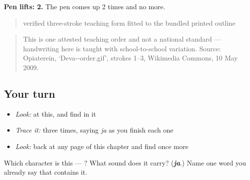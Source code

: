 \textbf{Pen lifts: 2.} The pen comes up 2 times and no more.

\begin{quote}
verified three-stroke teaching form fitted to the bundled printed outline
\end{quote}

\begin{quote}
This is one attested teaching order and not a national standard — handwriting here is taught with school-to-school variation. Source: Opiaterein, ‘Deva--order.gif’, strokes 1–3, Wikimedia Commons, 10 May 2009.
\end{quote}

\subsection*{Your turn}
\begin{itemize}
\raggedright
  \item \emph{Look:} at this, and find  in it
\end{itemize}

\begin{quote}
\end{quote}

\begin{itemize}
\raggedright
  \item \emph{Trace it:}  three times, saying \emph{ja} as you finish each one
  \item \emph{Look:} back at any page of this chapter and find  once more
\end{itemize}

\begin{tcolorbox}[breakable,colback=teal!4,colframe=teal!35!black,title={Before you move on}]
Which character is this — ? What sound does it carry? (\emph{\textbf{ja}}.) Name one word you already say that contains it.
\end{tcolorbox}
